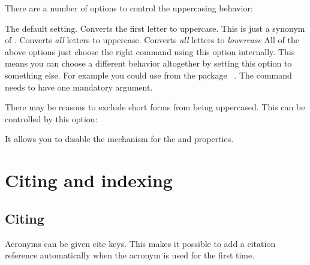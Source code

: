 \documentclass{acro-manual}
\begin{document}
\pagebreak

There are a number of options to control the uppercasing behavior:
\begin{options}
    The default setting. Converts the first letter to uppercase.
    This is just a synonym of .
    Converts \emph{all} letters to uppercase.
    Converts \emph{all} letters to \emph{lowercase}
    All of the above options just choose the right command using this option
    internally. This means you can choose a different behavior altogether by
    setting this option to something else.  For example you could use
     from the package
    ~\cite{pkg:mfirstuc}. The command needs to have one
    mandatory argument.
\end{options}

There may be reasons to exclude short forms from being uppercased.  This can
be controlled by this option:
\begin{options}
    It allows you to disable the mechanism for the  and
     properties.
\end{options}

\section{Citing and indexing}\label{sec:citing-indexing}
\subsection{Citing}\label{sec:citing}
Acronyms can be given cite keys.  This makes it possible to add a citation
reference automatically when the acronym is used for the first time.
\end{document}

